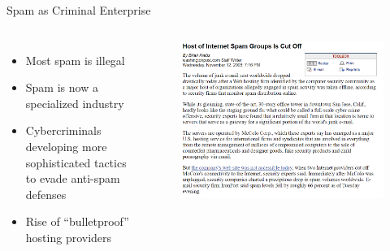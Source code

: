 \documentclass[nobackground,dvipsnames,table,aspectratio=169]{beamer}
\begin{document}
\begin{frame}{Spam as Criminal Enterprise}
    \begin{columns}
            \begin{itemize}
                \item Most spam is illegal
                \item Spam is now a specialized industry
                \item Cybercriminals developing more sophisticated tactics to evade anti-spam defenses
                \item Rise of “bulletproof” hosting providers
            \end{itemize}
            \begin{figure}
                \centering
                \includegraphics[width=\textwidth]{spam-groups-cut-off}
            \end{figure}
    \end{columns}
\end{frame}
\end{document}
